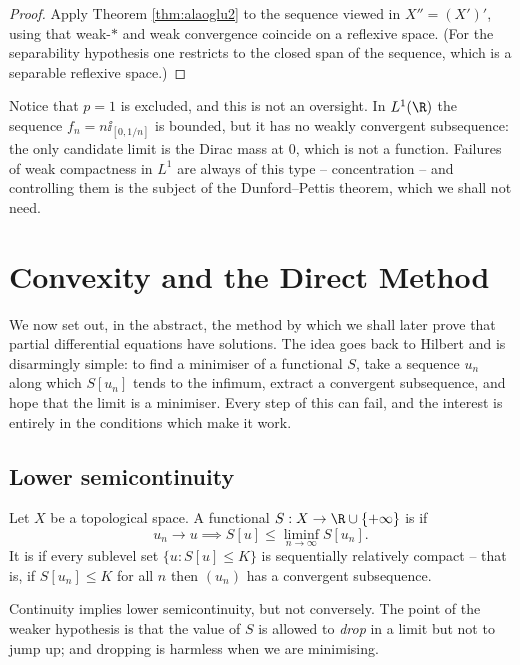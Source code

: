 \begin{proof}
	Apply Theorem \ref{thm:alaoglu2} to the sequence viewed in $X'' = (X')'$, using that weak-$*$ and weak convergence coincide on a reflexive space. (For the separability hypothesis one restricts to the closed span of the sequence, which is a separable reflexive space.)
\end{proof}

Notice that $p=1$ is excluded, and this is not an oversight. In $L^1(\R)$ the sequence $f_n = n \ii_{[0,1/n]}$ is bounded, but it has no weakly convergent subsequence: the only candidate limit is the Dirac mass at $0$, which is not a function. Failures of weak compactness in $L^1$ are always of this type -- concentration -- and controlling them is the subject of the Dunford--Pettis theorem, which we shall not need.

\section{Convexity and the Direct Method}\label{sec:direct}

We now set out, in the abstract, the method by which we shall later prove that partial differential equations have solutions. The idea goes back to Hilbert and is disarmingly simple: to find a minimiser of a functional $S$, take a sequence $u_n$ along which $S[u_n]$ tends to the infimum, extract a convergent subsequence, and hope that the limit is a minimiser. Every step of this can fail, and the interest is entirely in the conditions which make it work.

\subsection{Lower semicontinuity}

\begin{definition}
	Let $X$ be a topological space. A functional $S : X \to \R \cup \{+\infty\}$ is  if
	$$u_n \to u \implies S[u] \le \liminf_{n\to\infty}S[u_n].$$
	It is  if every sublevel set $\{u : S[u] \le K\}$ is sequentially relatively compact -- that is, if $S[u_n]\le K$ for all $n$ then $(u_n)$ has a convergent subsequence.
\end{definition}

Continuity implies lower semicontinuity, but not conversely. The point of the weaker hypothesis is that the value of $S$ is allowed to \emph{drop} in a limit but not to jump up; and dropping is harmless when we are minimising.

